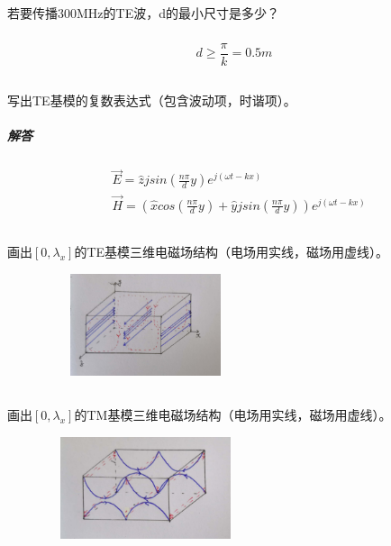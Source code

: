 \documentclass[UTF8]{ctexart}
\begin{document}
\paragraph{}
若要传播300MHz的TE波，d的最小尺寸是多少？
\subparagraph{}
\begin{equation*}
d \geq \frac{\pi}{k}=0.5m
\end{equation*}
\subsection{}
\paragraph{}
写出TE基模的复数表达式（包含波动项，时谐项）。
\subparagraph{解答}
\begin{equation*}
\begin{aligned}
&\vec E=\hat zjsin(\frac{n\pi}{d}y)e^{j(\omega t-kx)}\\
&\vec H=(\hat xcos(\frac{n\pi}{d}y)+\hat yjsin(\frac{n\pi}{d}y))e^{j(\omega t-kx)}
\end{aligned}
\end{equation*}
\subsection{}
\paragraph{}
画出$[0,\lambda_x]$的TE基模三维电磁场结构（电场用实线，磁场用虚线）。
\begin{figure}[htbp]
\centering
\includegraphics[width=6cm,height=3cm]{2018-3.jpg}
\end{figure}
\subsection{}
\paragraph{}
画出$[0,\lambda_x]$的TM基模三维电磁场结构（电场用实线，磁场用虚线）。
\begin{figure}[htbp]
\centering
\includegraphics[width=6cm,height=3cm]{2018-4.jpg}
\end{figure}
\end{document}
